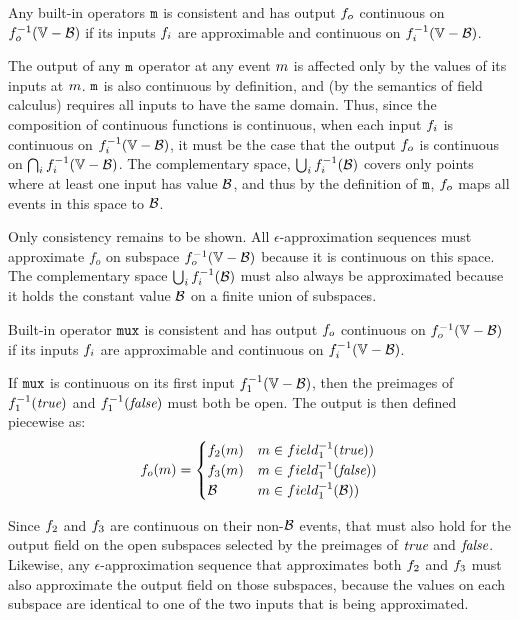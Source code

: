 \documentclass[12pt,a4paper,twoside,openright]{book}
\begin{document}
\begin{appendices}
\begin{lem}\label{thm:math}
  Any built-in operators $\texttt{m}$ is consistent and has output $f_o$ continuous on $\validdomain{\field_o}$ if its inputs $f_i$ are approximable and continuous on $\validdomain{\field_i}$.
\end{lem}
  The output of any $\texttt{m}$ operator at any event $m$ is affected only by the values of its inputs at $m$.  $\texttt{m}$ is also continuous by definition, and (by the semantics of field calculus) requires all inputs to have the same domain.
  Thus, since the composition of continuous functions is continuous, when each input $f_i$ is continuous on $\validdomain{\field_i}$, it must be the case that the output $f_o$ is continuous on $\bigcap_i \validdomain{\field_i}$.
  The complementary space, $\bigcup_i f_i^{-1}(\mathcal{B})$ covers only points where at least one input has value $\mathcal{B}$, and thus by the definition of $\texttt{m}$, $f_o$ maps all events in this space to $\mathcal{B}$.

  Only consistency remains to be shown.  All $\epsilon$-approximation sequences must approximate $f_o$ on subspace $\validdomain{\field_o}$ because it is continuous on this space.
  The complementary space $\bigcup_i f_i^{-1}(\mathcal{B})$ must also always be approximated because it holds the constant value $\mathcal{B}$ on a finite union of subspaces.

\begin{lem}\label{thm:mux}
  Built-in operator $\texttt{mux}$ is consistent and has output $f_o$ continuous on $\validdomain{\field_o}$ if its inputs $f_i$ are approximable and continuous on $\validdomain{\field_i}$.
\end{lem}
  If $\texttt{mux}$ is continuous on its first input $\validdomain{\field_1}$, then the preimages of $f_1^{-1}(\textit{true})$ and $f_1^{-1}(\textit{false})$ must both be open.  The output is then defined piecewise as:
  $$f_o(m) = \begin{cases}
    f_2(m) & m \in field_1^{-1}(\textit{true})) \\
    f_3(m) & m \in field_1^{-1}(\textit{false})) \\
    \mathcal{B} & m \in field_1^{-1}(\mathcal{B})) \\
  \end{cases}$$ 

  Since $f_2$ and $f_3$ are continuous on their non-$\mathcal{B}$ events, that must also hold for the output field on the open subspaces selected by the preimages of $\textit{true}$ and $\textit{false}$.
  Likewise, any $\epsilon$-approximation sequence that approximates both $f_2$ and $f_3$ must also approximate the output field on those subspaces, because the values on each subspace are identical to one of the two inputs that is being approximated.
  

\end{appendices}
\end{document}
